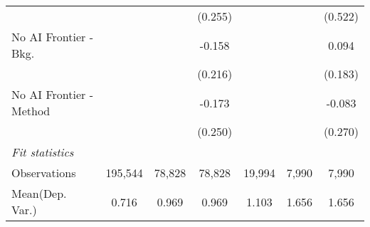 \begin{tabular}{lcccccc}
                           &              &               & (0.255)       &         &         & (0.522)\\   
   No AI Frontier - Bkg.   &              &               & -0.158        &         &         & 0.094\\   
                           &              &               & (0.216)       &         &         & (0.183)\\   
   No AI Frontier - Method &              &               & -0.173        &         &         & -0.083\\   
                           &              &               & (0.250)       &         &         & (0.270)\\   
   \midrule
   \emph{Fit statistics}\\
   Observations            & 195,544      & 78,828        & 78,828        & 19,994  & 7,990   & 7,990\\  
Mean(Dep. Var.) & 0.716 & 0.969 & 0.969 & 1.103 & 1.656 & 1.656 \\
   

\end{tabular}
